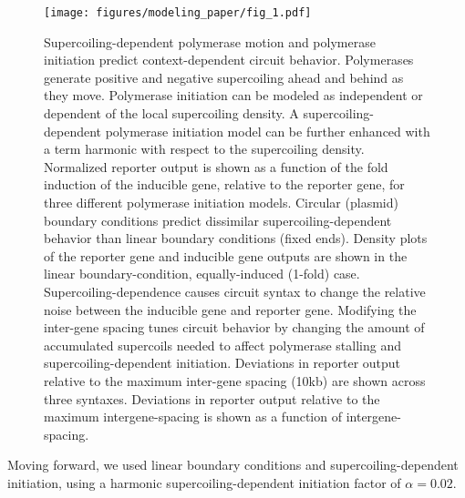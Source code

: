 \documentclass[11pt]{article}
\begin{document}
\begin{figure}[h]
    \centering
    {\texttt{[image: figures/modeling\_paper/fig\_1.pdf]}
    \label{fig:supercoiling_with_energy_cartoon}
    \label{fig:reporter_output_by_init_type}
    \label{fig:reporter_output_by_bc}
    \label{fig:output_distribution_by_orientation}
    \label{fig:intergene_spacing_cartoon}
    \label{fig:reporter_output_by_intergene_spacing}
    \label{fig:reporter_output_by_spacing_fold_induction}}
    \caption{Supercoiling-dependent polymerase motion and polymerase initiation predict context-dependent circuit behavior.
          Polymerases generate positive and negative supercoiling ahead and behind as they move. Polymerase initiation can be modeled as independent or dependent of the local supercoiling density. A supercoiling-dependent polymerase initiation model can be further enhanced with a term harmonic with respect to the supercoiling density.
         Normalized reporter output is shown as a function of the fold induction of the inducible gene, relative to the reporter gene, for three different polymerase initiation models.
         Circular (plasmid) boundary conditions predict dissimilar supercoiling-dependent behavior than linear boundary conditions (fixed ends).
         Density plots of the reporter gene and inducible gene outputs are shown in the linear boundary-condition, equally-induced (1-fold) case. Supercoiling-dependence causes circuit syntax to change the relative noise between the inducible gene and reporter gene.
         Modifying the inter-gene spacing tunes circuit behavior by changing the amount of accumulated supercoils needed to affect polymerase stalling and supercoiling-dependent initiation.
         Deviations in reporter output relative to the maximum inter-gene spacing (10kb) are shown across three syntaxes.
         Deviations in reporter output relative to the maximum intergene-spacing is shown as a function of intergene-spacing.
    } \label{fig:top:orientation_bc_behavior}
\end{figure}

Moving forward, we used linear boundary conditions and supercoiling-dependent initiation, using a harmonic supercoiling-dependent initiation factor of \(\alpha = 0.02\).
\end{document}
